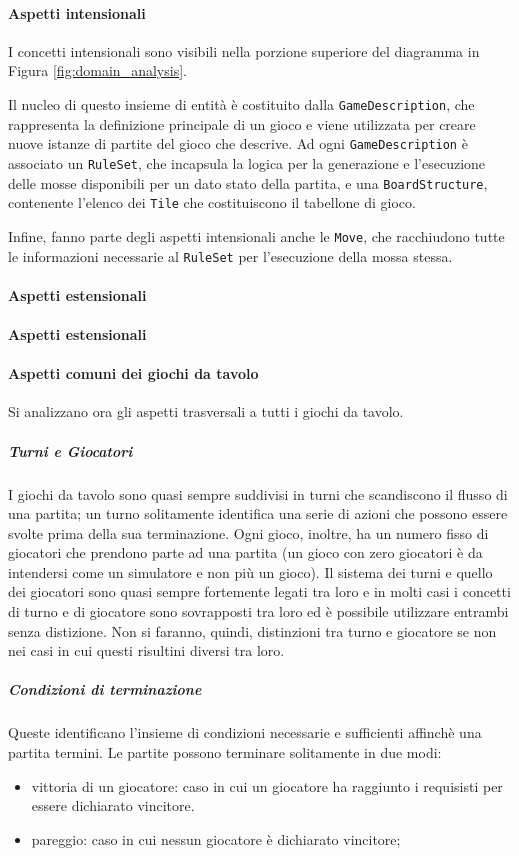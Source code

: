 \paragraph{Aspetti intensionali}
I concetti intensionali sono visibili nella porzione superiore del diagramma in Figura \ref{fig:domain_analysis}.

Il nucleo di questo insieme di entità è costituito dalla \texttt{GameDescription}, che rappresenta la definizione principale di un gioco e viene utilizzata per creare nuove istanze di partite del gioco che descrive.
%
Ad ogni \texttt{GameDescription} è associato un \texttt{RuleSet}, che incapsula la logica per la generazione e l'esecuzione delle mosse disponibili per un dato stato della partita, e una \texttt{BoardStructure}, contenente l'elenco dei \texttt{Tile} che costituiscono il tabellone di gioco.

Infine, fanno parte degli aspetti intensionali anche le \texttt{Move}, che racchiudono tutte le informazioni necessarie al \texttt{RuleSet} per l'esecuzione della mossa stessa.

\paragraph{Aspetti estensionali}

\paragraph{Aspetti estensionali}
%

\paragraph{Aspetti comuni dei giochi da tavolo}
%
Si analizzano ora gli aspetti trasversali a tutti i giochi da tavolo.
%
\subparagraph{Turni e Giocatori}
%
I giochi da tavolo sono quasi sempre suddivisi in turni che scandiscono il flusso di una partita; un turno solitamente identifica una serie di azioni che possono essere svolte prima della sua terminazione.
%
Ogni gioco, inoltre, ha un numero fisso di giocatori che prendono parte ad una partita (un gioco con zero giocatori è da intendersi come un simulatore e non più un gioco).
%
Il sistema dei turni e quello dei giocatori sono quasi sempre fortemente legati tra loro e in molti casi i concetti di turno e di giocatore sono sovrapposti tra loro ed è possibile utilizzare entrambi senza distizione.
%
Non si faranno, quindi, distinzioni tra turno e giocatore se non nei casi in cui questi risultini diversi tra loro.
%
\subparagraph{Condizioni di terminazione}
%
Queste identificano l'insieme di condizioni necessarie e sufficienti affinchè una partita termini.
%
Le partite possono terminare solitamente in due modi:
\begin{itemize}
  \item vittoria di un giocatore: caso in cui un giocatore ha raggiunto i requisisti per essere dichiarato vincitore.
  \item pareggio: caso in cui nessun giocatore è dichiarato vincitore;
\end{itemize}

